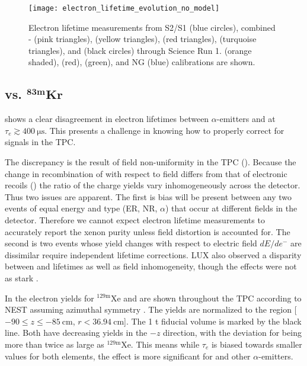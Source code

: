 \begin{figure}
\centering
\texttt{[image: electron\_lifetime\_evolution\_no\_model]}
\caption{Electron lifetime measurements from S2/S1 (blue circles), combined - (pink triangles), 
(yellow triangles),  (red triangles),  (turquoise triangles), and
\metakr (black circles) through Science Run 1.  \metakr (orange shaded),  (red), \ambe (green), and NG (blue) calibrations
are shown.}
\label{fig:electron_lifetimes_evolution_no_model}
\end{figure}



\subsection[\ce{^{222}Rn} vs. $\mathrm{^{83m}Kr}$][\ce{^{222}Rn} vs. $\mathrm{^{83m}Kr}$]{ vs. $\mathbf{^{83m}Kr}$}
\label{subsec:electron_lifetimes_rn222_vs_kr83m}
 shows a clear disagreement in electron lifetimes between $\alpha$-emitters and \metakr
at $\tau_e \gtrsim 400\ \mathrm{\mu s}$.  This presents a challenge in knowing how to properly correct \stwob for signals in the TPC.

The discrepancy is the result of field non-uniformity in the TPC ().  Because the change in recombination
of \alphadecays with respect to field differs from that of electronic recoils () the ratio
of the charge yields vary
inhomogeneously across the detector.  Thus two issues are apparent.  The first is bias will be present between any two events of equal
energy and type (ER, NR, $\alpha$) that occur at different fields in the detector.  Therefore we cannot expect electron lifetime
measurements to accurately
report the xenon purity unless field distortion is accounted for.  The second is two events whose \electron yield changes with respect to
electric field
$dE/de^-$ are dissimilar require independent lifetime corrections.  LUX also observed a disparity between \metakr and 
lifetimes as well as field inhomogeneity, though the effects were not as stark .

In  the electron yields for $\mathrm{^{129m}Xe}$ and 
are shown throughout the TPC according to NEST assuming azimuthal symmetry .  The yields are normalized to the
region [$-90 \leq z \leq -85\ \mathrm{cm}$,
$r < 36.94\ \mathrm{cm}$].  The 1 t fiducial volume is marked by the black line.  Both have decreasing yields in the $-z$ direction,
with the deviation for  being more than twice as large as $\mathrm{^{129m}Xe}$.  This means while $\tau_e$ is biased towards
smaller values for both elements, the effect is more significant for  and other $\alpha$-emitters.


